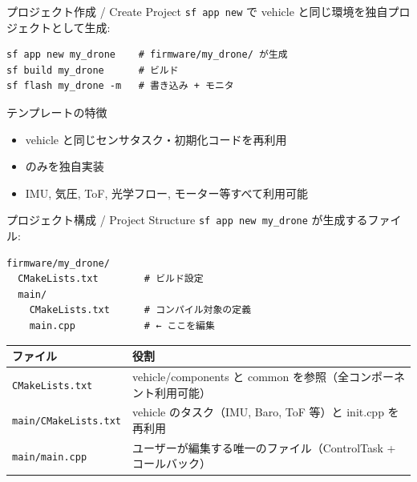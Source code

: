 \begin{frame}[fragile]{プロジェクト作成 / Create Project}
  {\small \texttt{sf app new} で vehicle と同じ環境を独自プロジェクトとして生成:}

  \vspace{0.3em}

  \begin{lstlisting}[style=sfbash]
sf app new my_drone    # firmware/my_drone/ が生成
sf build my_drone      # ビルド
sf flash my_drone -m   # 書き込み + モニタ
  \end{lstlisting}

  \vspace{0.5em}

  \begin{block}{テンプレートの特徴}
    \begin{itemize}
      \item vehicle と同じセンサタスク・初期化コードを再利用
      \item {} のみを独自実装
      \item IMU, 気圧, ToF, 光学フロー, モーター等すべて利用可能
    \end{itemize}
  \end{block}
\end{frame}

\begin{frame}[fragile]{プロジェクト構成 / Project Structure}
  {\small \texttt{sf app new my\_drone} が生成するファイル:}

  \vspace{0.3em}

  \begin{lstlisting}[style=sfbash, basicstyle=\ttfamily\small]
firmware/my_drone/
  CMakeLists.txt        # ビルド設定
  main/
    CMakeLists.txt      # コンパイル対象の定義
    main.cpp            # ← ここを編集
  \end{lstlisting}

  \vspace{0.3em}

  {\footnotesize
  \begin{tabular}{ll}
    \hline
    \textbf{ファイル} & \textbf{役割} \\
    \hline
    \texttt{CMakeLists.txt}      & vehicle/components と common を参照（全コンポーネント利用可能） \\
    \texttt{main/CMakeLists.txt} & vehicle のタスク（IMU, Baro, ToF 等）と init.cpp を再利用 \\
    \texttt{main/main.cpp}       & ユーザーが編集する唯一のファイル（ControlTask + コールバック） \\
    \hline
  \end{tabular}
  }
\end{frame}

